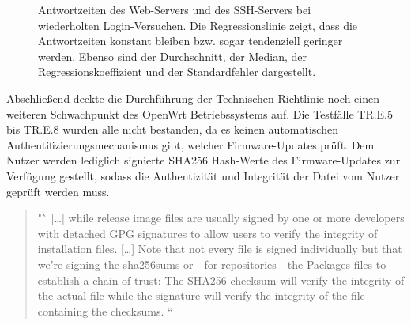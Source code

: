 \documentclass[a4paper]{book}
\begin{document}
\begin{large}
\begin{onehalfspace}
\begin{figure}[ht]
\centering
{}
\hspace*{0.05\hsize}
\caption{Antwortzeiten des Web-Servers und des SSH-Servers bei wiederholten Login-Versuchen. Die Regressionslinie zeigt, dass die Antwortzeiten konstant bleiben bzw. sogar tendenziell geringer werden. Ebenso sind der Durchschnitt, der Median, der Regressionskoeffizient und der Standardfehler dargestellt.}
\label{fig:bf_regression}
\end{figure}


\indent	
Abschließend deckte die Durchführung der Technischen Richtlinie noch einen weiteren Schwachpunkt des OpenWrt Betriebssystems auf. Die Testfälle TR.E.5 bis TR.E.8 wurden alle nicht bestanden, da es keinen automatischen Authentifizierungsmechanismus gibt, welcher Firmware-Updates prüft. Dem Nutzer werden lediglich signierte SHA256 Hash-Werte des Firmware-Updates zur Verfügung gestellt, sodass die Authentizität und Integrität der Datei vom Nutzer geprüft werden muss. 
\begin{quote}
"` […] while release image files are usually signed by one or more developers with detached GPG signatures to allow users to verify the integrity of installation files.
[…]
Note that not every file is signed individually but that we’re signing the sha256sums or - for repositories - the Packages files to establish a chain of trust: The SHA256 checksum will verify the integrity of the actual file while the signature will verify the integrity of the file containing the checksums. \cite{OpenWrtWebseite.2020b}“
\end{quote}
\vfill \pagebreak


\end{onehalfspace}
\end{large}
\end{document}
